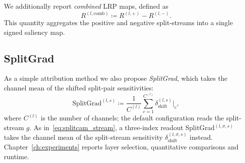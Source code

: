 We additionally report \emph{combined} LRP maps, defined as
\begin{equation}
R^{(l,\mathrm{comb})}\coloneqq R^{(l,+)}-R^{(l,-)}.
\label{eq:splitlrp_combined}
\end{equation}
This quantity aggregates the positive and negative split-streams into a single signed saliency map.

\subsection{SplitGrad}\label{sec:split_grad}

As a simple attribution method we also propose \emph{SplitGrad}, which takes the channel mean of the shifted split-pair sensitivities:
\begin{equation}
\text{SplitGrad}^{(l,s)}\coloneqq\frac{1}{C^{(l)}}\sum_{c=1}^{C^{(l)}}\delta_{\mathrm{shift}}^{(l,s)}\big\vert_c,
\label{eq:splitgrad}
\end{equation}
where $C^{(l)}$ is the number of channels; the default configuration reads the split-stream $g$. As in~\eqref{eq:splitcam_stream}, a three-index readout SplitGrad$^{(l,\sigma,s)}$ takes the channel mean of the split-stream sensitivity $\delta_{\mathrm{shift}}^{(l,\sigma,s)}$ instead. Chapter~\ref{ch:experiments} reports layer selection, quantitative comparisons and runtime.

